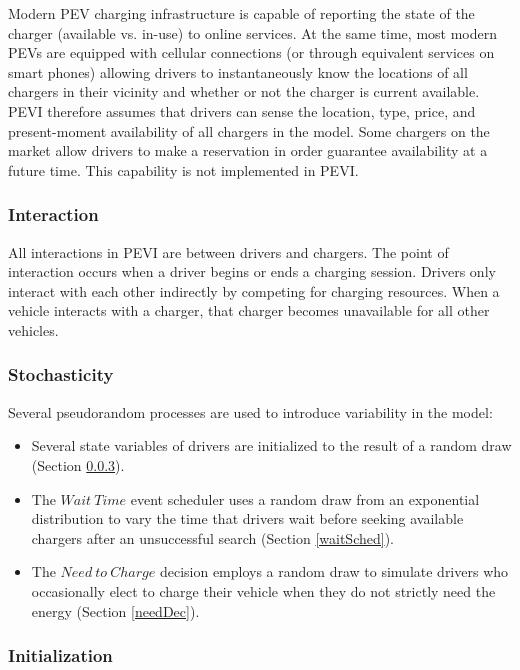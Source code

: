 \documentclass[journal]{IEEEtran}
\begin{document}
Modern PEV charging infrastructure is capable of reporting the state of the charger (available vs. in-use) to online services.  At the same time, most modern PEVs are equipped with cellular connections (or through equivalent services on smart phones) allowing drivers to instantaneously know the locations of all chargers in their vicinity and whether or not the charger is current available.  PEVI therefore assumes that drivers can sense the location, type, price, and present-moment availability of all chargers in the model.  Some chargers on the market allow drivers to make a reservation in order guarantee availability at a future time.  This capability is not implemented in PEVI.

\subsubsection{Interaction}

All interactions in PEVI are between drivers and chargers.  The point of interaction occurs when a driver begins or ends a charging session.  Drivers only interact with each other indirectly by competing for charging resources. When a vehicle interacts with a charger, that charger becomes unavailable for all other vehicles.  

\subsubsection{Stochasticity}

Several pseudorandom processes are used to introduce variability in the model:

\begin{itemize}
  \item Several state variables of drivers are initialized to the result of a random draw (Section \ref{init}). 
  \item The $Wait ~Time$ event scheduler uses a random draw from an exponential distribution to vary the time that drivers wait before seeking available chargers after an unsuccessful search (Section \ref{waitSched}).
  \item The $Need ~to ~Charge$ decision employs a random draw to simulate drivers who occasionally elect to charge their vehicle when they do not strictly need the energy (Section \ref{needDec}).
\end{itemize}

\subsubsection{Initialization}\label{init}
\end{document}
